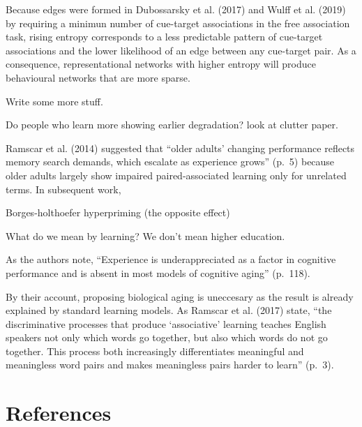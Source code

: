 \documentclass[
  man]{apa6}
\begin{document}
Because edges were formed in Dubossarsky et al. (2017) and Wulff et al. (2019) by requiring a minimun number of cue-target associations in the free association task, rising entropy corresponds to a less predictable pattern of cue-target associations and the lower likelihood of an edge between any cue-target pair. As a consequence, representational networks with higher entropy will produce behavioural networks that are more sparse.

Write some more stuff.

Do people who learn more showing earlier degradation? look at clutter paper.

Ramscar et al. (2014) suggested that ``older adults' changing performance reflects memory search demands, which escalate as experience grows'' (p.~5) because older adults largely show impaired paired-associated learning only for unrelated terms. In subsequent work,

Borges-holthoefer hyperpriming (the opposite effect)

What do we mean by learning? We don't mean higher education.

As the authors note, ``Experience is underappreciated as a factor in cognitive performance and is absent in most models of cognitive aging'' (p.~118).

By their account, proposing biological aging is uneccesary as the result is already explained by standard learning models. As Ramscar et al. (2017) state, ``the discriminative processes that produce `associative' learning teaches English speakers not only which words go together, but also which words do not go together. This process both increasingly differentiates meaningful and meaningless word pairs and makes meaningless pairs harder to learn'' (p.~3).

\newpage

\hypertarget{references}{%
\section{References}\label{references}}
\end{document}
